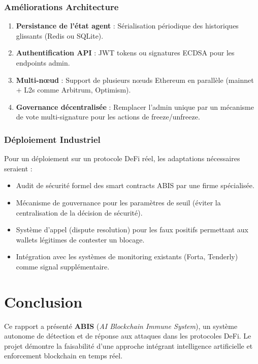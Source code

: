 \documentclass[12pt,a4paper]{report}
\begin{document}
\subsection{Améliorations Architecture}

\begin{enumerate}
  \item \textbf{Persistance de l'état agent} : Sérialisation périodique des historiques glissants (Redis ou SQLite).
  \item \textbf{Authentification API} : JWT tokens ou signatures ECDSA pour les endpoints admin.
  \item \textbf{Multi-nœud} : Support de plusieurs nœuds Ethereum en parallèle (mainnet + L2s comme Arbitrum, Optimism).
  \item \textbf{Governance décentralisée} : Remplacer l'admin unique par un mécanisme de vote multi-signature pour les actions de freeze/unfreeze.
\end{enumerate}

\subsection{Déploiement Industriel}

Pour un déploiement sur un protocole DeFi réel, les adaptations nécessaires seraient :
\begin{itemize}
  \item Audit de sécurité formel des smart contracts ABIS par une firme spécialisée.
  \item Mécanisme de gouvernance pour les paramètres de seuil (éviter la centralisation de la décision de sécurité).
  \item Système d'appel (dispute resolution) pour les faux positifs permettant aux wallets légitimes de contester un blocage.
  \item Intégration avec les systèmes de monitoring existants (Forta, Tenderly) comme signal supplémentaire.
\end{itemize}

\chapter{Conclusion}

Ce rapport a présenté \textbf{ABIS} (\textit{AI Blockchain Immune System}), un système autonome de détection et de réponse aux attaques dans les protocoles DeFi. Le projet démontre la faisabilité d'une approche intégrant intelligence artificielle et enforcement blockchain en temps réel.
\end{document}

